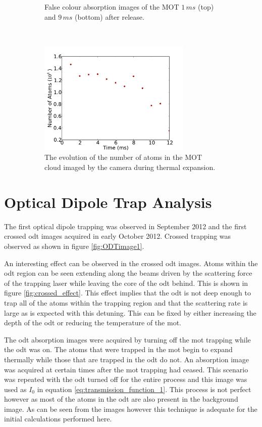 \begin{figure}[t]
\begin{subfigure}[b]{0.3\textwidth}
    \caption{False colour absorption images of the MOT $1\,\unit{ms}$ (top) and $9\,\unit{ms}$ (bottom) after release.}
    \label{fig:mot_example_images}
    \end{subfigure}~~~\begin{subfigure}[b]{0.6\textwidth}
    \centering
    \includegraphics[width=0.8\textwidth]{figs/MOT_atom_count.pdf}
    \caption{The evolution of the number of atoms in the MOT cloud imaged by the camera during thermal expansion.}
    \label{fig:mot_atom_count}
    \end{subfigure}
    \caption{}
\end{figure}

\section{Optical Dipole Trap Analysis}
The first optical dipole trapping was observed in September 2012 and the first crossed \gls{odt} images acquired in early October 2012. Crossed trapping was observed as shown in figure \ref{fig:ODTimage1}.

An interesting effect can be observed in the crossed \gls{odt} images. Atoms within the \gls{odt} region can be seen extending along the beams driven by the scattering force of the trapping laser while leaving the core of the \gls{odt} behind. This is shown in figure \ref{fig:crossed_effect}. This effect implies that the \gls{odt} is not deep enough to trap all of the atoms within the trapping region and that the scattering rate is large as is expected with this detuning. This can be fixed by either increasing the depth of the \gls{odt} or reducing the temperature of the \gls{mot}.

The \gls{odt} absorption images were acquired by turning off the \gls{mot} trapping while the \gls{odt} was on. The atoms that were trapped in the \gls{mot} begin to expand thermally while those that are trapped in the \gls{odt} do not. An absorption image was acquired at certain times after the \gls{mot} trapping had ceased. This scenario was repeated with the \gls{odt} turned off for the entire process and this image was used as $I_0$ in equation \ref{eq:transmission_function_1}. This process is not perfect however as most of the atoms in the \gls{odt} are also present in the background image. As can be seen from the images however this technique is adequate for the initial calculations performed here.


